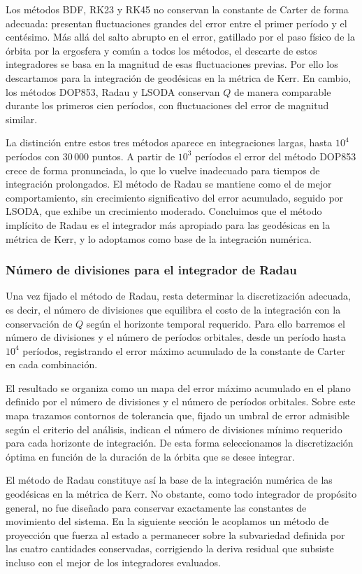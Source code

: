 Los métodos BDF, RK23 y RK45 no conservan la constante de Carter de forma adecuada: presentan fluctuaciones grandes del error entre el primer período y el centésimo. Más allá del salto abrupto en el error, gatillado por el paso físico de la órbita por la ergosfera y común a todos los métodos, el descarte de estos integradores se basa en la magnitud de esas fluctuaciones previas. Por ello los descartamos para la integración de geodésicas en la métrica de Kerr. En cambio, los métodos DOP853, Radau y LSODA conservan $Q$ de manera comparable durante los primeros cien períodos, con fluctuaciones del error de magnitud similar.

La distinción entre estos tres métodos aparece en integraciones largas, hasta $10^4$ períodos con $30\,000$ puntos. A partir de $10^3$ períodos el error del método DOP853 crece de forma pronunciada, lo que lo vuelve inadecuado para tiempos de integración prolongados. El método de Radau se mantiene como el de mejor comportamiento, sin crecimiento significativo del error acumulado, seguido por LSODA, que exhibe un crecimiento moderado. Concluimos que el método implícito de Radau es el integrador más apropiado para las geodésicas en la métrica de Kerr, y lo adoptamos como base de la integración numérica.

\subsubsection{Número de divisiones para el integrador de Radau}

Una vez fijado el método de Radau, resta determinar la discretización adecuada, es decir, el número de divisiones que equilibra el costo de la integración con la conservación de $Q$ según el horizonte temporal requerido. Para ello barremos el número de divisiones y el número de períodos orbitales, desde un período hasta $10^4$ períodos, registrando el error máximo acumulado de la constante de Carter en cada combinación.

El resultado se organiza como un mapa del error máximo acumulado en el plano definido por el número de divisiones y el número de períodos orbitales. Sobre este mapa trazamos contornos de tolerancia que, fijado un umbral de error admisible según el criterio del análisis, indican el número de divisiones mínimo requerido para cada horizonte de integración. De esta forma seleccionamos la discretización óptima en función de la duración de la órbita que se desee integrar.

El método de Radau constituye así la base de la integración numérica de las geodésicas en la métrica de Kerr. No obstante, como todo integrador de propósito general, no fue diseñado para conservar exactamente las constantes de movimiento del sistema. En la siguiente sección le acoplamos un método de proyección que fuerza al estado a permanecer sobre la subvariedad definida por las cuatro cantidades conservadas, corrigiendo la deriva residual que subsiste incluso con el mejor de los integradores evaluados.
